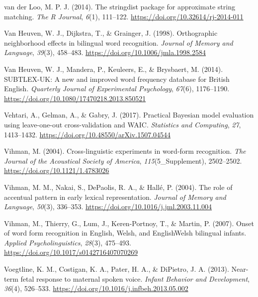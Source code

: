 \documentclass[
  12pt,
  b5paperpaper,
  twoside]{scrreprt}
\newlength{\cslhangindent}
\newlength{\cslentryspacingunit} %
\newenvironment{CSLReferences}[2] %
 {%
  \setlength{\parindent}{0pt}
  \ifodd #1
  \let\oldpar\par
  \def\par{\hangindent=\cslhangindent\oldpar}
  \fi
  \setlength{\parskip}{#2\cslentryspacingunit}
 }%
 {}
\begin{document}
\begin{CSLReferences}{1}{0}
\leavevmode{}%
van der Loo, M. P. J. (2014). The stringdist package for approximate
string matching. \emph{The R Journal}, \emph{6}(1), 111--122.
\url{https://doi.org/10.32614/rj-2014-011}

\leavevmode{}%
Van Heuven, W. J., Dijkstra, T., \& Grainger, J. (1998). Orthographic
neighborhood effects in bilingual word recognition. \emph{Journal of
Memory and Language}, \emph{39}(3), 458--483.
\url{https://doi.org/10.1006/jmla.1998.2584}

\leavevmode{}%
Van Heuven, W. J., Mandera, P., Keuleers, E., \& Brysbaert, M. (2014).
{SUBTLEX-UK}: A new and improved word frequency database for {British
English}. \emph{Quarterly Journal of Experimental Psychology},
\emph{67}(6), 1176--1190.
\url{https://doi.org/10.1080/17470218.2013.850521}

\leavevmode{}%
Vehtari, A., Gelman, A., \& Gabry, J. (2017). Practical {Bayesian} model
evaluation using leave-one-out cross-validation and {WAIC}.
\emph{Statistics and Computing}, \emph{27}, 1413--1432.
\url{https://doi.org/10.48550/arXiv.1507.04544}

\leavevmode{}%
Vihman, M. (2004). Cross-linguistic experiments in word-form
recognition. \emph{The Journal of the Acoustical Society of America},
\emph{115}(5\_Supplement), 2502--2502.
\url{https://doi.org/10.1121/1.4783026}

\leavevmode{}%
Vihman, M. M., Nakai, S., DePaolis, R. A., \& Hallé, P. (2004). The role
of accentual pattern in early lexical representation. \emph{Journal of
Memory and Language}, \emph{50}(3), 336--353.
\url{https://doi.org/10.1016/j.jml.2003.11.004}

\leavevmode{}%
Vihman, M., Thierry, G., Lum, J., Keren-Portnoy, T., \& Martin, P.
(2007). Onset of word form recognition in {English}, {Welsh}, and
{English}{\textendash}{Welsh} bilingual infants. \emph{Applied
Psycholinguistics}, \emph{28}(3), 475--493.
\url{https://doi.org/10.1017/s0142716407070269}

\leavevmode{}%
Voegtline, K. M., Costigan, K. A., Pater, H. A., \& DiPietro, J. A.
(2013). Near-term fetal response to maternal spoken voice. \emph{Infant
Behavior and Development}, \emph{36}(4), 526--533.
\url{https://doi.org/10.1016/j.infbeh.2013.05.002}


\end{CSLReferences}
\end{document}
